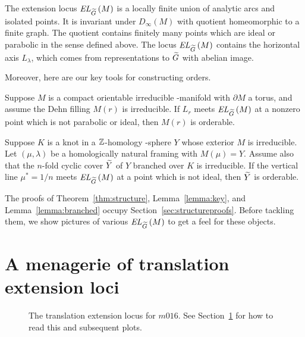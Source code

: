 \documentclass[tikz, sepfignums, defaultenums]{nmd/article}
\newcommand{\TEL}[1]{\mathit{EL}_\Gtil\left(#1\right)}
\newcommand{\SymTEL}[1]{D_\infty\left(#1\right)}
\begin{document}
\begin{theorem}\label{thm:structure}
  The extension locus $\TEL{M}$ is a locally finite union of analytic
  arcs and isolated points.  It is invariant under
  $\SymTEL{M}$ with quotient homeomorphic to a finite graph.
  The quotient contains finitely many points which are ideal or
  parabolic in the sense defined above. The locus $\TEL{M}$ contains
  the horizontal axis $L_\lambda$, which comes from representations to
  $\Gtil$ with abelian image.
\end{theorem}
Moreover, here are our key tools for constructing orders.

\begin{lemma}\label{lemma:key}
  Suppose $M$ is a compact orientable irreducible \3-manifold with
  $\partial M$ a torus, and assume the Dehn filling $M(r)$ is
  irreducible.  If $L_r$ meets $\TEL{M}$ at a nonzero
  point which is not parabolic or ideal, then $M(r)$ is orderable.
\end{lemma}

\begin{lemma}\label{lemma:branched}
  Suppose $K$ is a knot in a ${\mathbb Z}$-homology \3-sphere $Y$ whose
  exterior $M$ is irreducible.  Let $(\mu, \lambda)$ be a
  homologically natural framing with $M(\mu) = Y$.  Assume also that
  the $n$-fold cyclic cover $\Ytil$ of $Y$ branched over $K$ is
  irreducible.  If the vertical line $\mu^* = 1/n$ meets $\TEL{M}$ at
  a point which is not ideal, then $\Ytil$ is orderable.
\end{lemma}
The proofs of Theorem~\ref{thm:structure}, Lemma~\ref{lemma:key}, and
Lemma~\ref{lemma:branched} occupy Section~\ref{sec:structureproofs}.
Before tackling them, we show pictures of various $\TEL{M}$ to get a
feel for these objects.

\section{A menagerie of translation extension loci}
\label{sec:menagerie}

\begin{figure}
  \begin{center}
  \end{center}
  
  \vspace{-0.4cm}

  \caption{The translation extension locus for $m016$.  See
    Section~\ref{sec:menagerie} for how to read this and subsequent
    plots.}
  \label{fig:m016}
\end{figure}
\end{document}
